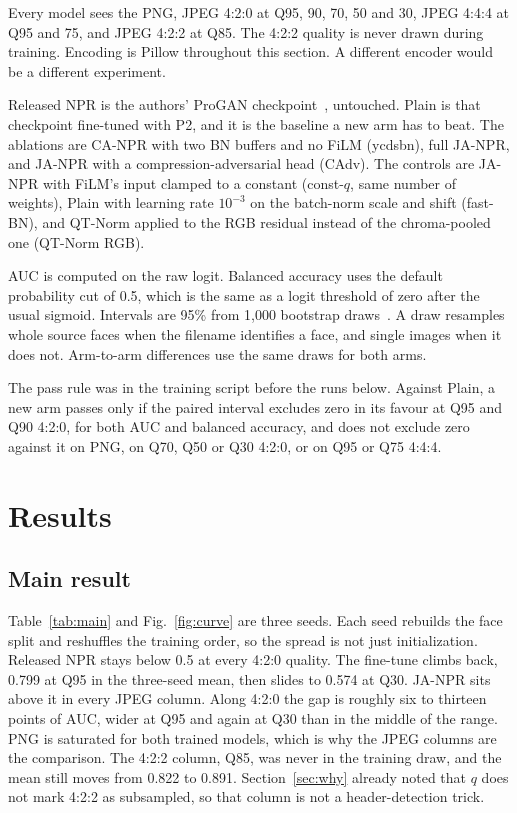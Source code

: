 \documentclass[conference]{IEEEtran}
\begin{document}
Every model sees the PNG, JPEG 4:2:0 at Q95, 90, 70, 50 and 30, JPEG 4:4:4 at Q95 and 75, and JPEG 4:2:2 at Q85. The 4:2:2 quality is never drawn during training. Encoding is Pillow throughout this section. A different encoder would be a different experiment.

Released NPR is the authors' ProGAN checkpoint~\cite{tan2024npr}, untouched. Plain is that checkpoint fine-tuned with P2, and it is the baseline a new arm has to beat. The ablations are CA-NPR with two BN buffers and no FiLM (ycdsbn), full JA-NPR, and JA-NPR with a compression-adversarial head (CAdv). The controls are JA-NPR with FiLM's input clamped to a constant (const-$q$, same number of weights), Plain with learning rate $10^{-3}$ on the batch-norm scale and shift (fast-BN), and QT-Norm applied to the RGB residual instead of the chroma-pooled one (QT-Norm RGB).

AUC is computed on the raw logit. Balanced accuracy uses the default probability cut of 0.5, which is the same as a logit threshold of zero after the usual sigmoid. Intervals are 95\% from 1{,}000 bootstrap draws~\cite{efron1993bootstrap}. A draw resamples whole source faces when the filename identifies a face, and single images when it does not. Arm-to-arm differences use the same draws for both arms.

The pass rule was in the training script before the runs below. Against Plain, a new arm passes only if the paired interval excludes zero in its favour at Q95 and Q90 4:2:0, for both AUC and balanced accuracy, and does not exclude zero against it on PNG, on Q70, Q50 or Q30 4:2:0, or on Q95 or Q75 4:4:4.

\section{Results}
\subsection{Main result}
Table~\ref{tab:main} and Fig.~\ref{fig:curve} are three seeds. Each seed rebuilds the face split and reshuffles the training order, so the spread is not just initialization. Released NPR stays below 0.5 at every 4:2:0 quality. The fine-tune climbs back, 0.799 at Q95 in the three-seed mean, then slides to 0.574 at Q30. JA-NPR sits above it in every JPEG column. Along 4:2:0 the gap is roughly six to thirteen points of AUC, wider at Q95 and again at Q30 than in the middle of the range. PNG is saturated for both trained models, which is why the JPEG columns are the comparison. The 4:2:2 column, Q85, was never in the training draw, and the mean still moves from 0.822 to 0.891. Section~\ref{sec:why} already noted that $q$ does not mark 4:2:2 as subsampled, so that column is not a header-detection trick.
\end{document}
